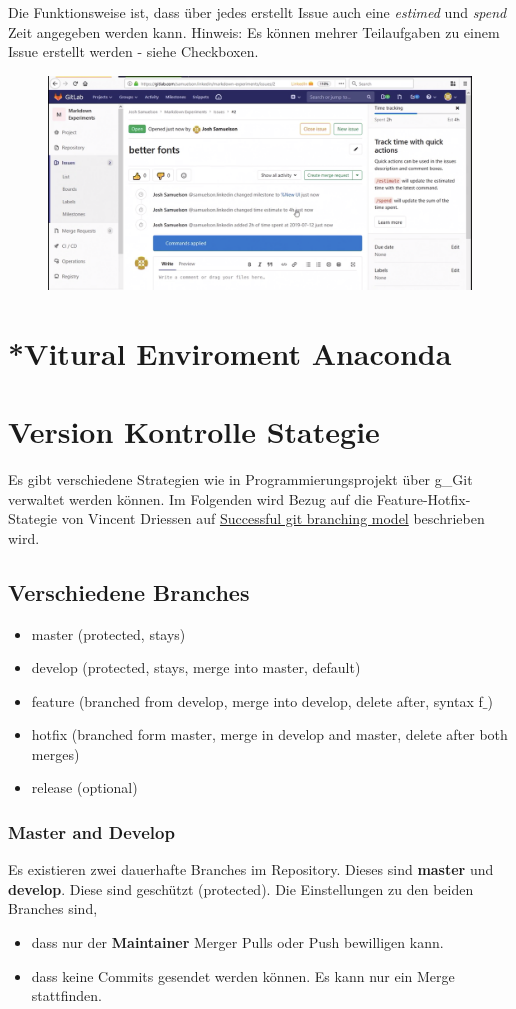 Die Funktionsweise ist, dass über jedes erstellt Issue auch eine \textit{estimed} und \textit{spend} Zeit angegeben werden kann. Hinweis: Es können mehrer Teilaufgaben zu einem Issue erstellt werden - siehe Checkboxen.

\begin{figure}[H]
	\centering
	\includegraphics[width=0.7\linewidth]{attachment/chapter_5/Scc015}
\end{figure}


\section{*Vitural Enviroment Anaconda}

\section{Version Kontrolle Stategie}
Es gibt verschiedene Strategien wie in Programmierungsprojekt über \gls{g_Git} verwaltet werden können. Im Folgenden wird Bezug auf die Feature-Hotfix-Stategie von Vincent Driessen auf \href{https://nvie.com/posts/a-successful-git-branching-model/}{Successful git branching model} beschrieben wird.

\subsection{Verschiedene Branches}
\begin{itemize} 
\item master  (protected, stays)
\item develop (protected, stays, merge into master, default)
\item feature (branched from develop, merge into develop, delete after, syntax f$\_$)
\item hotfix (branched form master, merge in develop and master, delete after both merges)
\item release (optional)
\end{itemize}

\subsubsection{Master and Develop}
Es existieren zwei dauerhafte Branches im Repository. Dieses sind \textbf{master} und \textbf{develop}. Diese sind geschützt (protected). Die Einstellungen zu den beiden Branches sind,
\begin{itemize}
	\item dass nur der \textbf{Maintainer} Merger Pulls oder Push bewilligen kann.
	\item dass keine Commits gesendet werden können. Es kann nur ein Merge stattfinden.
\end{itemize}

